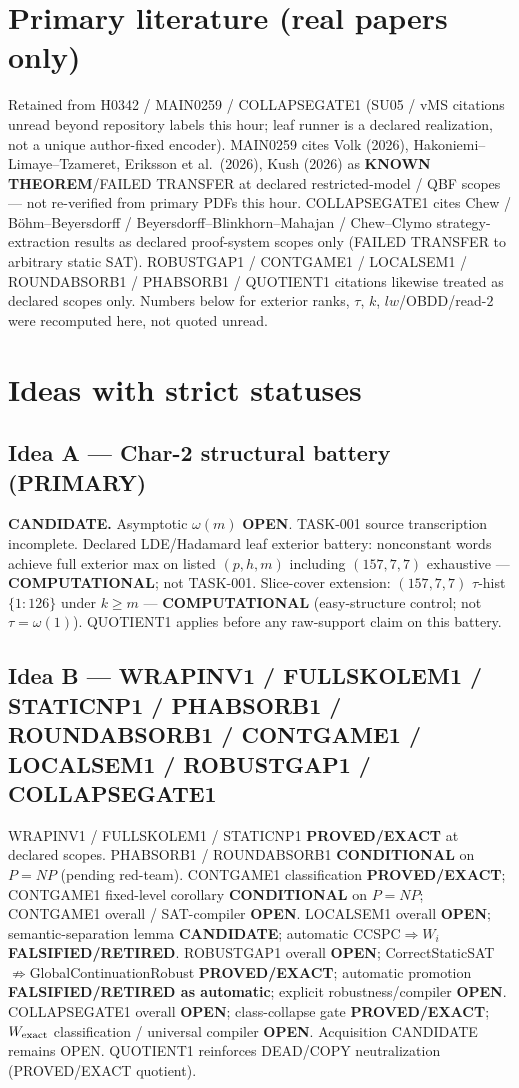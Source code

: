 \documentclass[11pt]{article}
\begin{document}
\section*{Primary literature (real papers only)}
Retained from H0342 / MAIN0259 / COLLAPSEGATE1 (SU05 / vMS citations unread beyond repository
labels this hour; leaf runner is a declared realization, not a unique author-fixed encoder).
MAIN0259 cites Volk (2026), Hakoniemi--Limaye--Tzameret, Eriksson et al.\ (2026), Kush (2026)
as \textbf{KNOWN THEOREM}/FAILED TRANSFER at declared restricted-model / QBF scopes ---
not re-verified from primary PDFs this hour.
COLLAPSEGATE1 cites Chew / B\"ohm--Beyersdorff / Beyersdorff--Blinkhorn--Mahajan / Chew--Clymo
strategy-extraction results as declared proof-system scopes only (FAILED TRANSFER to arbitrary
static SAT).
ROBUSTGAP1 / CONTGAME1 / LOCALSEM1 / ROUNDABSORB1 / PHABSORB1 / QUOTIENT1 citations likewise
treated as declared scopes only.
Numbers below for exterior ranks, $\tau$, $k$, $lw$/OBDD/read-$2$
were recomputed here, not quoted unread.

\section*{Ideas with strict statuses}
\subsection*{Idea A --- Char-2 structural battery (PRIMARY)}
\textbf{CANDIDATE.} Asymptotic $\omega(m)$ \textbf{OPEN}. TASK-001 source transcription incomplete.
Declared LDE/Hadamard leaf exterior battery: nonconstant words achieve full exterior max on
listed $(p,h,m)$ including $(157,7,7)$ exhaustive --- \textbf{COMPUTATIONAL}; not TASK-001.
Slice-cover extension: $(157,7,7)$ $\tau$-hist $\{1{:}126\}$ under $k{\ge}m$ ---
\textbf{COMPUTATIONAL} (easy-structure control; not $\tau=\omega(1)$).
QUOTIENT1 applies before any raw-support claim on this battery.

\subsection*{Idea B --- WRAPINV1 / FULLSKOLEM1 / STATICNP1 / PHABSORB1 / ROUNDABSORB1 / CONTGAME1 / LOCALSEM1 / ROBUSTGAP1 / COLLAPSEGATE1}
WRAPINV1 / FULLSKOLEM1 / STATICNP1 \textbf{PROVED/EXACT} at declared scopes.
PHABSORB1 / ROUNDABSORB1 \textbf{CONDITIONAL} on $P=NP$ (pending red-team).
CONTGAME1 classification \textbf{PROVED/EXACT}; CONTGAME1 fixed-level corollary
\textbf{CONDITIONAL} on $P=NP$; CONTGAME1 overall / SAT-compiler \textbf{OPEN}.
LOCALSEM1 overall \textbf{OPEN}; semantic-separation lemma \textbf{CANDIDATE};
automatic CCSPC$\Rightarrow W_i$ \textbf{FALSIFIED/RETIRED}.
ROBUSTGAP1 overall \textbf{OPEN}; CorrectStaticSAT$\not\Rightarrow$GlobalContinuationRobust
\textbf{PROVED/EXACT}; automatic promotion \textbf{FALSIFIED/RETIRED as automatic};
explicit robustness/compiler \textbf{OPEN}.
COLLAPSEGATE1 overall \textbf{OPEN}; class-collapse gate \textbf{PROVED/EXACT};
$W_{\rm exact}$ classification / universal compiler \textbf{OPEN}.
Acquisition CANDIDATE remains OPEN.
QUOTIENT1 reinforces DEAD/COPY neutralization (PROVED/EXACT quotient).
\end{document}
